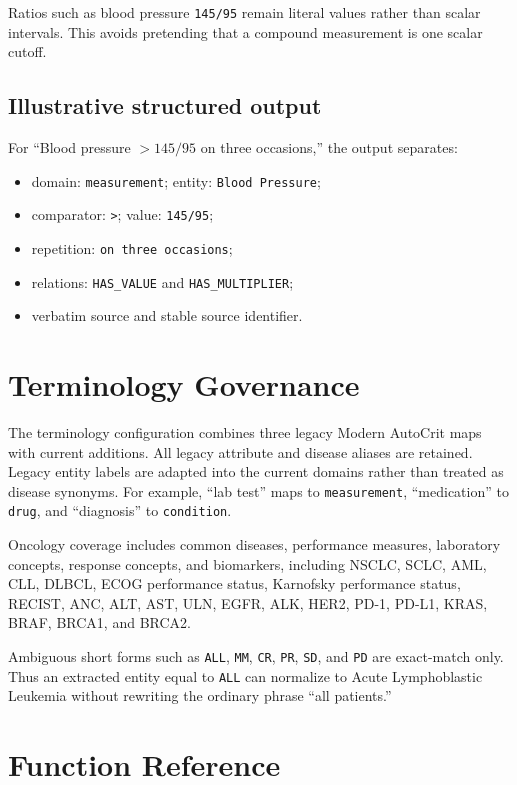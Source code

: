 \documentclass[11pt]{article}
\newcommand{\code}[1]{\nolinkurl{#1}}
\begin{document}
Ratios such as blood pressure \code{145/95} remain literal values rather than scalar intervals. This avoids pretending that a compound measurement is one scalar cutoff.

\subsection{Illustrative structured output}

For ``Blood pressure $>145/95$ on three occasions,'' the output separates:

\begin{itemize}
  \item domain: \code{measurement}; entity: \code{Blood Pressure};
  \item comparator: \code{>}; value: \code{145/95};
  \item repetition: \code{on three occasions};
  \item relations: \code{HAS_VALUE} and \code{HAS_MULTIPLIER};
  \item verbatim source and stable source identifier.
\end{itemize}

\section{Terminology Governance}

The terminology configuration combines three legacy Modern AutoCrit maps with current additions. All legacy attribute and disease aliases are retained. Legacy entity labels are adapted into the current domains rather than treated as disease synonyms. For example, ``lab test'' maps to \code{measurement}, ``medication'' to \code{drug}, and ``diagnosis'' to \code{condition}.

Oncology coverage includes common diseases, performance measures, laboratory concepts, response concepts, and biomarkers, including NSCLC, SCLC, AML, CLL, DLBCL, ECOG performance status, Karnofsky performance status, RECIST, ANC, ALT, AST, ULN, EGFR, ALK, HER2, PD-1, PD-L1, KRAS, BRAF, BRCA1, and BRCA2.

Ambiguous short forms such as \code{ALL}, \code{MM}, \code{CR}, \code{PR}, \code{SD}, and \code{PD} are exact-match only. Thus an extracted entity equal to \code{ALL} can normalize to Acute Lymphoblastic Leukemia without rewriting the ordinary phrase ``all patients.''

\section{Function Reference}
\end{document}
